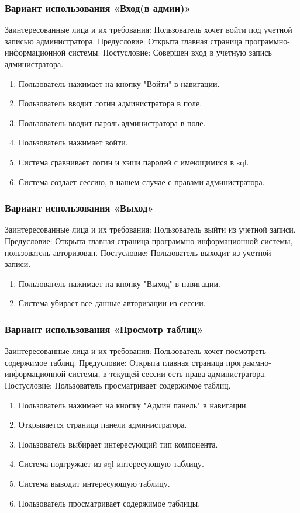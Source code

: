 \subsubsection{Вариант использования «Вход(в админ)»}
Заинтересованные лица и их требования: Пользователь хочет войти под учетной записью администратора.
Предусловие: Открыта главная страница программно-информационной системы.
Постусловие: Совершен вход в учетную запись администратора.
\begin{enumerate}
	\item Пользователь нажимает на кнопку "Войти" в навигации.
	\item Пользователь вводит логин администратора в поле.
	\item Пользователь вводит пароль администратора в поле.
	\item Пользователь нажимает войти.
	\item Система сравнивает логин и хэши паролей с имеющимися в sql.
	\item Система создает сессию, в нашем случае с правами администратора.
\end{enumerate}

\subsubsection{Вариант использования «Выход»}
Заинтересованные лица и их требования: Пользователь выйти из учетной записи.
Предусловие: Открыта главная страница программно-информационной системы, пользователь авторизован.
Постусловие: Пользователь выходит из учетной записи.
\begin{enumerate}
	\item Пользователь нажимает на кнопку "Выход" в навигации.
	\item Система убирает все данные авторизации из сессии.
\end{enumerate}

\subsubsection{Вариант использования «Просмотр таблиц»}
Заинтересованные лица и их требования: Пользователь хочет посмотреть содержимое таблиц.
Предусловие: Открыта главная страница программно-информационной системы, в текущей сессии есть права администратора.
Постусловие: Пользователь просматривает содержимое таблиц.
\begin{enumerate}
	\item Пользователь нажимает на кнопку "Админ панель" в навигации.
	\item Открывается страница панели администратора.
	\item Пользователь выбирает интересующий тип компонента.
	\item Система подгружает из sql интересующую таблицу.
	\item Система выводит интересующую таблицу.
	\item Пользователь просматривает содержимое таблицы.
\end{enumerate}

